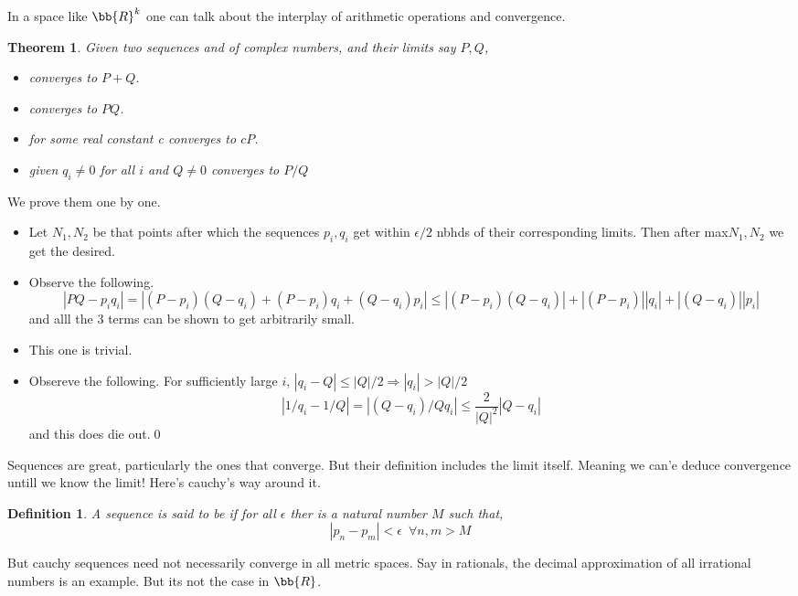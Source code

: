 \documentclass{myclass}
\newtheorem*{definition}{Definition}
\newtheorem*{theorem}{Theorem}
\begin{document}
In a space like $\bb{R}^k$ one can talk about the interplay of arithmetic operations and convergence.

\begin{theorem}
    Given two sequences  and  of complex numbers, and their limits say $P,Q$,
    \begin{itemize}
        \item {} converges to $P+Q$.
        \item {} converges to $PQ$.
        \item {} for some real constant c converges to $cP$.
        \item {} given $q_i\neq 0$ for all $i$ and $Q\neq 0$ converges to $P/Q$
    \end{itemize}
\end{theorem}
\begin{prf}
    We prove them one by one.
    \begin{itemize}
        \item Let $N_1,N_2$ be that points after which the sequences $p_i,q_i$ get within $\epsilon/2$ nbhds of their corresponding limits. Then after max{$N_1,N_2$} we get the desired.
        \item Observe the following.$$|PQ-p_iq_i|=|(P-p_i)(Q-q_i)+(P-p_i)q_i+(Q-q_i)p_i|\leq |(P-p_i)(Q-q_i)|+|(P-p_i)||q_i|+|(Q-q_i)||p_i|$$ and alll the 3 terms can be shown to get arbitrarily small.
        \item This one is trivial.
        \item Obsereve the following. For sufficiently large $i$, $|q_i-Q|\leq |Q|/2 \Rightarrow |q_i|>|Q|/2$ $$|1/q_i-1/Q|=|(Q-q_i)/Qq_i|\leq \frac{2}{|Q|^2}|Q-q_i|$$ and this does die out.\qed
    \end{itemize}
\end{prf}

Sequences are great, particularly the ones that converge. But their definition includes the limit itself. Meaning we can'e deduce convergence untill we know the limit! Here's cauchy's way around it.

\begin{definition}
    A sequence  is said to be  if for all $\epsilon$ ther is a natural number $M$ such that,
    $$|p_n-p_m|<\epsilon\,\,\,\forall n,m>M$$
\end{definition}

But cauchy sequences need not necessarily converge in all metric spaces. Say in rationals, the decimal approximation of all irrational numbers is an example.
But its not the case in $\bb{R}$.
\end{document}

